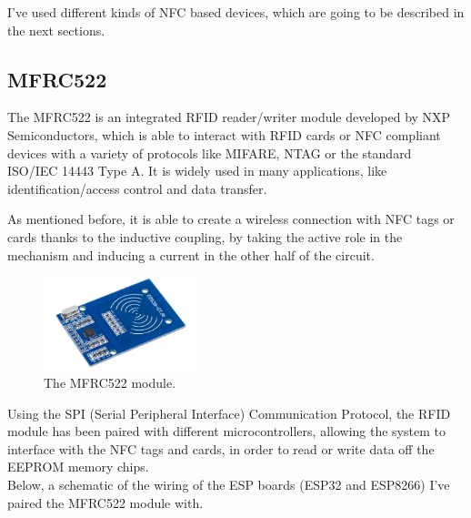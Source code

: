 \documentclass[target=bach,aauheader=,style=]{thud}
\begin{document}
I've used different kinds of NFC based devices, which are going to be described in the next sections.\pagebreak

\subsection{MFRC522}

The MFRC522 is an integrated RFID reader/writer module developed by NXP Semiconductors, which is able to interact with RFID cards or NFC compliant devices with a variety of protocols like MIFARE, NTAG or the standard ISO/IEC 14443 Type A. It is widely used in many applications, like identification/access control and data transfer.\par

As mentioned before, it is able to create a wireless connection with NFC tags or cards thanks to the inductive coupling, by taking the active role in the mechanism and inducing a current in the other half of the circuit.\par
\begin{figure}[h]
	\centering
	\includegraphics[width=0.4\textwidth]{mfrc522}
	\caption{The MFRC522 module.}
	\label{fig:mfrc522}
\end{figure} 

Using the SPI (Serial Peripheral Interface) Communication Protocol, the RFID module has been paired with different microcontrollers, allowing the system to interface with the NFC tags and cards, in order to read or write data off the EEPROM memory chips.\\
Below, a schematic of the wiring of the ESP boards (ESP32 and ESP8266) I've paired the MFRC522 module with.
\end{document}
